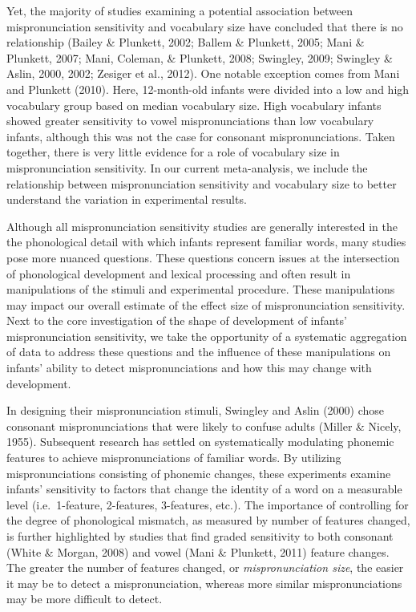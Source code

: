 \documentclass[man]{apa6}
\theoremstyle{definition}
\theoremstyle{definition}
\theoremstyle{definition}
\theoremstyle{remark}
\begin{document}
Yet, the majority of studies examining a potential association between
mispronunciation sensitivity and vocabulary size have concluded that
there is no relationship (Bailey \& Plunkett, 2002; Ballem \& Plunkett,
2005; Mani \& Plunkett, 2007; Mani, Coleman, \& Plunkett, 2008;
Swingley, 2009; Swingley \& Aslin, 2000, 2002; Zesiger et al., 2012).
One notable exception comes from Mani and Plunkett (2010). Here,
12-month-old infants were divided into a low and high vocabulary group
based on median vocabulary size. High vocabulary infants showed greater
sensitivity to vowel mispronunciations than low vocabulary infants,
although this was not the case for consonant mispronunciations. Taken
together, there is very little evidence for a role of vocabulary size in
mispronunciation sensitivity. In our current meta-analysis, we include
the relationship between mispronunciation sensitivity and vocabulary
size to better understand the variation in experimental results.

Although all mispronunciation sensitivity studies are generally
interested in the the phonological detail with which infants represent
familiar words, many studies pose more nuanced questions. These
questions concern issues at the intersection of phonological development
and lexical processing and often result in manipulations of the stimuli
and experimental procedure. These manipulations may impact our overall
estimate of the effect size of mispronunciation sensitivity. Next to the
core investigation of the shape of development of infants'
mispronunciation sensitivity, we take the opportunity of a systematic
aggregation of data to address these questions and the influence of
these manipulations on infants' ability to detect mispronunciations and
how this may change with development.

In designing their mispronunciation stimuli, Swingley and Aslin (2000)
chose consonant mispronunciations that were likely to confuse adults
(Miller \& Nicely, 1955). Subsequent research has settled on
systematically modulating phonemic features to achieve mispronunciations
of familiar words. By utilizing mispronunciations consisting of phonemic
changes, these experiments examine infants' sensitivity to factors that
change the identity of a word on a measurable level (i.e.~1-feature,
2-features, 3-features, etc.). The importance of controlling for the
degree of phonological mismatch, as measured by number of features
changed, is further highlighted by studies that find graded sensitivity
to both consonant (White \& Morgan, 2008) and vowel (Mani \& Plunkett,
2011) feature changes. The greater the number of features changed, or
\emph{mispronunciation size}, the easier it may be to detect a
mispronunciation, whereas more similar mispronunciations may be more
difficult to detect.
\end{document}
